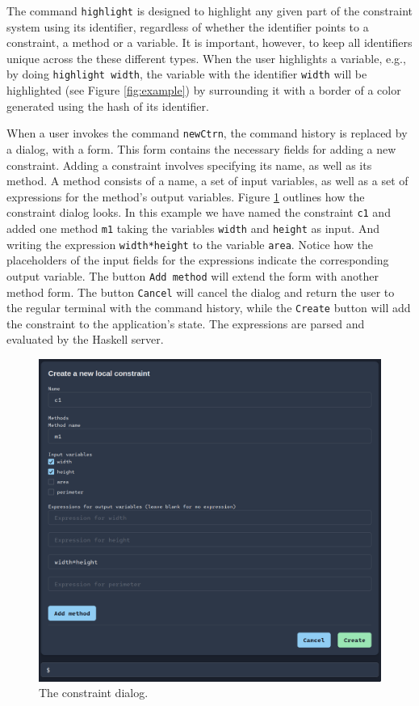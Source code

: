 \documentclass[11pt, a4paper]{article}
\begin{document}
The command \texttt{highlight} is designed to highlight any given part of the constraint system using its identifier, regardless of whether the identifier points to a constraint, a method or a variable. It is important, however, to keep all identifiers unique across the these different types. When the user highlights a variable, e.g., by doing \texttt{highlight width}, the variable with the identifier \texttt{width} will be highlighted (see Figure \ref{fig:example}) by surrounding it with a border of a color generated using the hash of its identifier.

When a user invokes the command \texttt{newCtrn}, the command history is replaced by a dialog, with a form. This form contains the necessary fields for adding a new constraint. Adding a constraint involves specifying its name, as well as its method. A method consists of a name, a set of input variables, as well as a set of expressions for the method's output variables. Figure \ref{fig:dialog} outlines how the constraint dialog looks. In this example we have named the constraint \texttt{c1} and added one method \texttt{m1} taking the variables \texttt{width} and \texttt{height} as input. And writing the expression \texttt{width*height} to the variable \texttt{area}. Notice how the placeholders of the input fields for the expressions indicate the corresponding output variable. The button \texttt{Add method} will extend the form with another method form. The button \texttt{Cancel} will cancel the dialog and return the user to the regular terminal with the command history, while the \texttt{Create} button will add the constraint to the application's state. The expressions are parsed and evaluated by the Haskell server.

\begin{figure}[h]
  \centering
  \includegraphics[width=\textwidth]{figures/dialog.png}
  \caption{The constraint dialog.}
  \label{fig:dialog}
\end{figure}
\end{document}
